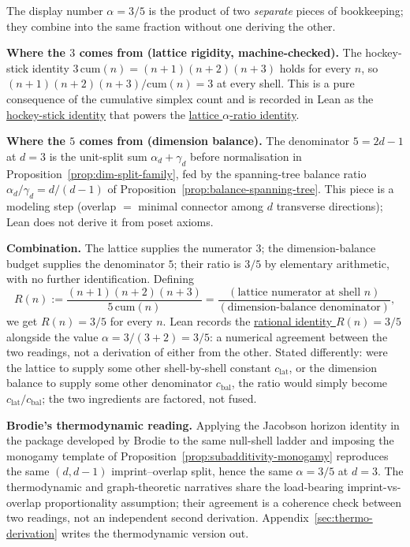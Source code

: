 \documentclass[11pt]{amsart}
\begin{document}
The display number \(\alpha=3/5\) is the product of two \emph{separate} pieces of bookkeeping; they combine into the same fraction without one deriving the other.

\textbf{Where the \(3\) comes from (lattice rigidity, machine-checked).} The hockey-stick identity \(3\,\mathrm{cum}(n)=(n+1)(n+2)(n+3)\) holds for every \(n\), so \((n+1)(n+2)(n+3)/\mathrm{cum}(n)=3\) at every shell. This is a pure consequence of the cumulative simplex count and is recorded in Lean as the \hyperref[lean:hockey-stick]{hockey-stick identity} that powers the \hyperref[lean:lattice-ratio]{lattice \(\alpha\)-ratio identity}.

\textbf{Where the \(5\) comes from (dimension balance).} The denominator \(5=2d-1\) at \(d=3\) is the unit-split sum \(\alpha_d+\gamma_d\) before normalisation in Proposition~\ref{prop:dim-split-family}, fed by the spanning-tree balance ratio \(\alpha_d/\gamma_d=d/(d-1)\) of Proposition~\ref{prop:balance-spanning-tree}. This piece is a modeling step (overlap \(=\) minimal connector among \(d\) transverse directions); Lean does not derive it from poset axioms.

\textbf{Combination.} The lattice supplies the numerator \(3\); the dimension-balance budget supplies the denominator \(5\); their ratio is \(3/5\) by elementary arithmetic, with no further identification. Defining
\[
R(n):=\frac{(n+1)(n+2)(n+3)}{5\,\mathrm{cum}(n)}=\frac{(\text{lattice numerator at shell }n)}{(\text{dimension-balance denominator})},
\]
we get \(R(n)=3/5\) for every \(n\). Lean records the \hyperref[lean:imprint-3-5]{rational identity \(R(n)=3/5\)} alongside the value \hyperref[lean:alpha-3-5]{\(\alpha=3/(3+2)=3/5\)}: a numerical agreement between the two readings, not a derivation of either from the other. Stated differently: were the lattice to supply some other shell-by-shell constant \(c_{\mathrm{lat}}\), or the dimension balance to supply some other denominator \(c_{\mathrm{bal}}\), the ratio would simply become \(c_{\mathrm{lat}}/c_{\mathrm{bal}}\); the two ingredients are factored, not fused.

\textbf{Brodie's thermodynamic reading.} Applying the Jacobson horizon identity in the package developed by Brodie \cite{brodie2026} to the same null-shell ladder and imposing the monogamy template of Proposition~\ref{prop:subadditivity-monogamy} reproduces the same \((d,d-1)\) imprint--overlap split, hence the same \(\alpha=3/5\) at \(d=3\). The thermodynamic and graph-theoretic narratives share the load-bearing imprint-vs-overlap proportionality assumption; their agreement is a coherence check between two readings, not an independent second derivation. Appendix~\ref{sec:thermo-derivation} writes the thermodynamic version out.
\end{document}
